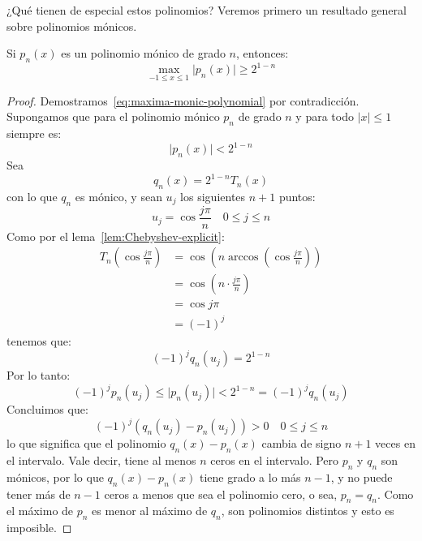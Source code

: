   ¿Qué tienen de especial estos polinomios?
  Veremos primero un resultado general sobre polinomios mónicos.
  \begin{theorem}
    \label{theo:maxima-monic-polynomial}
    Si \(p_n(x)\) es un polinomio mónico de grado \(n\),
    entonces:
    \begin{equation}
      \label{eq:maxima-monic-polynomial}
      \max_{-1 \le x \le 1} \lvert p_n(x) \rvert
        \ge 2^{1 - n}
    \end{equation}
  \end{theorem}
  \begin{proof}
    Demostramos~\eqref{eq:maxima-monic-polynomial} por contradicción.
    Supongamos que para el polinomio mónico \(p_n\) de grado \(n\)
    y para todo \(\lvert x \rvert \le 1\) siempre es:
    \begin{equation*}
      \lvert p_n(x) \rvert
        < 2^{1 - n}
    \end{equation*}
    Sea
    \begin{equation*}
      q_n(x)
        = 2^{1 - n} T_n(x)
    \end{equation*}
    con lo que \(q_n\) es mónico,
    y sean \(u_j\) los siguientes \(n + 1\) puntos:
    \begin{equation*}
      u_j
        = \cos \frac{j \pi}{n}
          \quad 0 \le j \le n
    \end{equation*}
    Como por el lema~\ref{lem:Chebyshev-explicit}:
    \begin{align*}
      T_n \left( \cos \frac{j \pi}{n} \right)
        &= \cos \left( n \arccos \left( \cos \frac{j \pi}{n} \right) \right) \\
        &= \cos \left( n \cdot \frac{j \pi}{n} \right) \\
        &= \cos j \pi \\
        &= (-1)^j
    \end{align*}
    tenemos que:
    \begin{equation*}
      (-1)^j q_n(u_j)
        = 2^{1 - n}
    \end{equation*}
    Por lo tanto:
    \begin{equation*}
      (-1)^j p_n(u_j)
        \le \lvert p_n(u_j) \rvert
        < 2^{1 - n}
        = (-1)^j q_n(u_j)
    \end{equation*}
    Concluimos que:
    \begin{equation*}
      (-1)^j (q_n(u_j) - p_n(u_j)) > 0
        \quad 0 \le j \le n
    \end{equation*}
    lo que significa que el polinomio \(q_n(x) - p_n(x)\)
    cambia de signo \(n + 1\) veces en el intervalo.
    Vale decir,
    tiene al menos \(n\) ceros en el intervalo.
    Pero \(p_n\) y \(q_n\) son mónicos,
    por lo que \(q_n(x) - p_n(x)\) tiene grado a lo más \(n - 1\),
    y no puede tener más de \(n - 1\) ceros
    a menos que sea el polinomio cero,
    o sea,
    \(p_n = q_n\).
    Como el máximo de \(p_n\) es menor al máximo de \(q_n\),
    son polinomios distintos y esto es imposible.
  \end{proof}
